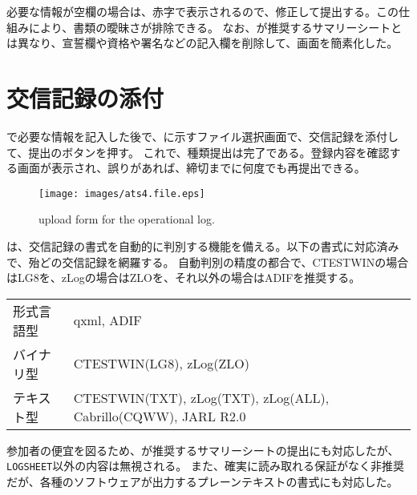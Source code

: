 \documentclass[10pt,a4paper]{book}
\begin{document}
必要な情報が空欄の場合は、赤字で表示されるので、修正して提出する。この仕組みにより、書類の曖昧さが排除できる。
なお、\jarl{}が推奨するサマリーシートとは異なり、宣誓欄や資格や署名などの記入欄を削除して、画面を簡素化した。

\section{交信記録の添付\label{sect:upload}}

で必要な情報を記入した後で、に示すファイル選択画面で、交信記録を添付して、提出のボタンを押す。
これで、種類提出は完了である。登録内容を確認する画面が表示され、誤りがあれば、締切までに何度でも再提出できる。

\begin{figure}[H]
\centering
\texttt{[image: images/ats4.file.eps]}
\caption{upload form for the operational log.\label{fig:upload}}
\end{figure}

は、交信記録の書式を自動的に判別する機能を備える。以下の書式に対応済みで、殆どの交信記録を網羅する。
自動判別の精度の都合で、CTESTWINの場合はLG8を、zLogの場合はZLOを、それ以外の場合はADIFを推奨する。

\begin{table}[H]
\raggedright
\begin{tabular}{BT}
形式言語型 & qxml, ADIF \\
バイナリ型 & CTESTWIN(LG8), zLog(ZLO) \\
テキスト型 & CTESTWIN(TXT), zLog(TXT), zLog(ALL), Cabrillo(CQWW), JARL R2.0 \\
\end{tabular}
\end{table}

参加者の便宜を図るため、\jarl{}が推奨するサマリーシートの提出にも対応したが、\texttt{LOGSHEET}以外の内容は無視される。
また、確実に読み取れる保証がなく非推奨だが、各種のソフトウェアが出力するプレーンテキストの書式にも対応した。
\end{document}
